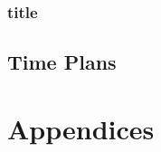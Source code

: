 \documentclass[paper=a4, fontsize=11pt,twoside]{scrartcl}		%
\begin{document}
\subsubsection{title}
\subsection{Time Plans}


\clearpage

\section{Appendices}
\clearpage




\end{document}
